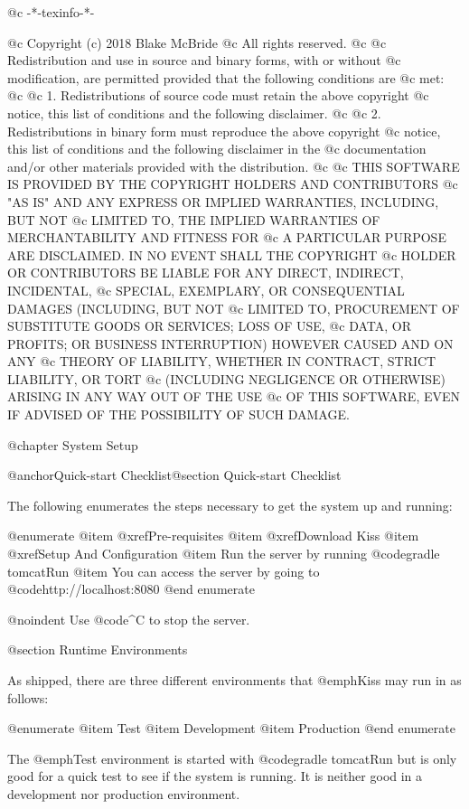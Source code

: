@c -*-texinfo-*-

@c  Copyright (c) 2018 Blake McBride
@c  All rights reserved.
@c
@c  Redistribution and use in source and binary forms, with or without
@c  modification, are permitted provided that the following conditions are
@c  met:
@c
@c  1. Redistributions of source code must retain the above copyright
@c  notice, this list of conditions and the following disclaimer.
@c
@c  2. Redistributions in binary form must reproduce the above copyright
@c  notice, this list of conditions and the following disclaimer in the
@c  documentation and/or other materials provided with the distribution.
@c
@c  THIS SOFTWARE IS PROVIDED BY THE COPYRIGHT HOLDERS AND CONTRIBUTORS
@c  "AS IS" AND ANY EXPRESS OR IMPLIED WARRANTIES, INCLUDING, BUT NOT
@c  LIMITED TO, THE IMPLIED WARRANTIES OF MERCHANTABILITY AND FITNESS FOR
@c  A PARTICULAR PURPOSE ARE DISCLAIMED. IN NO EVENT SHALL THE COPYRIGHT
@c  HOLDER OR CONTRIBUTORS BE LIABLE FOR ANY DIRECT, INDIRECT, INCIDENTAL,
@c  SPECIAL, EXEMPLARY, OR CONSEQUENTIAL DAMAGES (INCLUDING, BUT NOT
@c  LIMITED TO, PROCUREMENT OF SUBSTITUTE GOODS OR SERVICES; LOSS OF USE,
@c  DATA, OR PROFITS; OR BUSINESS INTERRUPTION) HOWEVER CAUSED AND ON ANY
@c  THEORY OF LIABILITY, WHETHER IN CONTRACT, STRICT LIABILITY, OR TORT
@c  (INCLUDING NEGLIGENCE OR OTHERWISE) ARISING IN ANY WAY OUT OF THE USE
@c  OF THIS SOFTWARE, EVEN IF ADVISED OF THE POSSIBILITY OF SUCH DAMAGE.


@chapter System Setup


@anchor{Quick-start Checklist}@section Quick-start Checklist

The following enumerates the steps necessary to get the system up and running:

@enumerate
@item
@xref{Pre-requisites}
@item
@xref{Download Kiss}
@item
@xref{Setup And Configuration}
@item
Run the server by running @code{gradle tomcatRun}
@item
You can access the server by going to @code{http://localhost:8080}
@end enumerate

@noindent Use @code{^C} to stop the server.

@section Runtime Environments

As shipped, there are three different environments that @emph{Kiss} may
run in as follows:

@enumerate
@item
Test
@item
Development
@item 
Production
@end enumerate

The @emph{Test} environment is started with @code{gradle tomcatRun} but
is only good for a quick test to see if the system is running.  It is
neither good in a development nor production environment.

